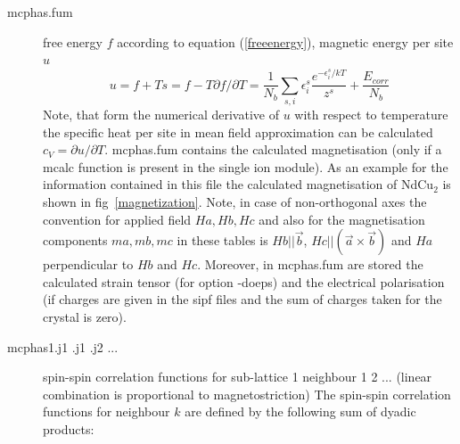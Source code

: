 \begin{description}
\item [\prg mcphas.fum]    free energy $f$ according to equation (\ref{freeenergy}), magnetic energy per site $u$
\begin{equation}
u=f+Ts=f-T\partial f/\partial T=\frac{1}{N_b}\sum_{s,i} \epsilon^s_i \frac{e^{-\epsilon^s_i/kT}}{z^s}+\frac{E_{corr}}{N_b}
\end{equation}
                            Note, that form the numerical derivative of $u$ with respect to temperature 
                             the specific heat per site in mean field approximation can be calculated $c_V=\partial u/\partial T$.
                           {\prg mcphas.fum} contains the calculated
                           magnetisation  (only if a {\prg mcalc} function is present in the single ion module).
                            As an example for the information
			   contained in this file the calculated magnetisation  of NdCu$_2$ is shown in
			   fig~\ref{magnetization}.
                            Note, in case of non-orthogonal axes the convention for applied field $Ha, Hb,Hc$ and
                            also for the magnetisation components $ma,mb,mc$ in these tables 
                            is $Hb||\vec b$, $Hc||(\vec a \times \vec b)$ and $Ha$ perpendicular to $Hb$ and $Hc$.
                           Moreover, in {\prg mcphas.fum} are stored
                           the calculated strain tensor (for option -doeps) and the 
                           electrical polarisation (if charges are given in the sipf files and the sum of charges
                           taken for the crystal is zero).

\item [\prg mcphas1.j1 .j1 .j2 ...] 
               spin-spin correlation functions for sub-lattice 1 neighbour 1 2 ...
	       (linear combination is proportional to magnetostriction)
	       The spin-spin correlation functions for neighbour $k$ are defined by
	       the following sum of dyadic products:


\end{description}
